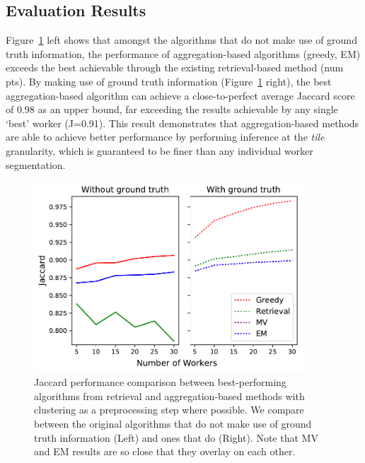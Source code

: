  \subsection{Evaluation Results}
\par \noindent Figure~\ref{retrieval_vs_aggregation} left shows that amongst the algorithms that do not make use of ground truth information, the performance of aggregation-based algorithms (greedy, EM) exceeds the best achievable through the existing retrieval-based method (num pts). By making use of ground truth information (Figure~\ref{retrieval_vs_aggregation} right), the best aggregation-based algorithm can achieve a close-to-perfect average Jaccard score of 0.98 as an upper bound, far exceeding the results achievable by any single `best' worker (J=0.91). This result demonstrates that aggregation-based methods are able to achieve better performance by performing inference at the \textit{tile} granularity, which is guaranteed to be finer than any individual worker segmentation. 
\begin{figure}[h!]
   \vspace{-10pt}
   \centering
   \includegraphics[width=0.9\textwidth]{plots/Retrieval_vs_Aggregation.pdf}
   \caption{Jaccard performance comparison between best-performing algorithms from retrieval and aggregation-based methods with clustering as a preprocessing step where possible. We compare between the original algorithms that do not make use of ground truth information (Left) and ones that do (Right). Note that MV and EM results are so close that they overlay on each other.}
   \label{retrieval_vs_aggregation}   
\end{figure} 
\vspace{-10pt}

